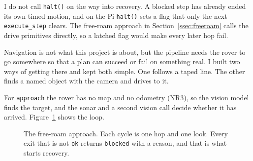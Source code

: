 I do not call \texttt{halt()} on the way into recovery. A blocked step has already
ended its own timed motion, and on the Pi \texttt{halt()} sets a flag that only
the next \texttt{execute\_step} clears. The free-roam approach in
Section~\ref{ssec:freeroam} calls the drive primitives directly, so a latched flag
would make every later hop fail.

\label{sec:navigation}

Navigation is not what this project is about, but the pipeline needs the rover to
go somewhere so that a plan can succeed or fail on something real. I built two
ways of getting there and kept both simple. One follows a taped line. The other
finds a named object with the camera and drives to it.

\label{ssec:freeroam}

For \texttt{approach} the rover has no map and no odometry (NR3), so the vision
model finds the target, and the sonar and a second vision call decide whether it
has arrived. Figure~\ref{fig:approach} shows the loop.

\begin{figure}[htbp]
  \centering
  \caption{The free-roam approach. Each cycle is one hop and one look. Every exit that is not \texttt{ok} returns \texttt{blocked} with a reason, and that is what starts recovery.}
  \label{fig:approach}
\end{figure}

